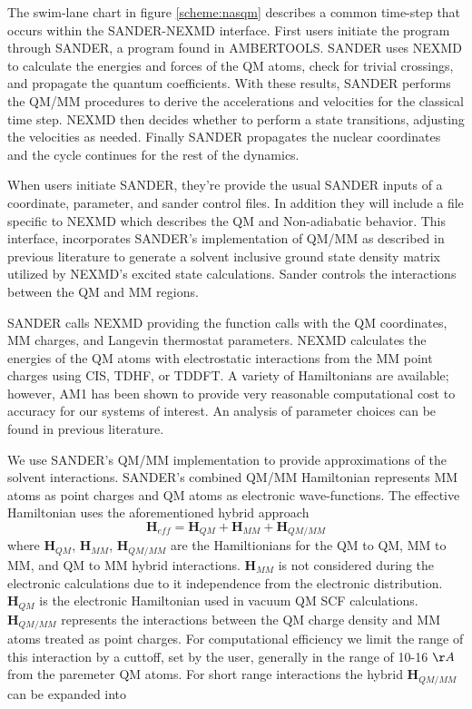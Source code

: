 The swim-lane chart in figure \ref{scheme:nasqm} describes a common time-step that occurs within the SANDER-NEXMD interface.
First users initiate the program through SANDER, a program found in AMBERTOOLS. SANDER uses NEXMD to calculate the energies and forces of the QM atoms, check for trivial crossings, and propagate the quantum coefficients.
With these results, SANDER performs the QM/MM procedures to derive the accelerations and velocities for the classical time step.
NEXMD then decides whether to perform a state transitions, adjusting the velocities as needed.
Finally SANDER propagates the nuclear coordinates and the cycle continues for the rest of the dynamics.

When users initiate SANDER, they're provide the usual SANDER inputs of a
coordinate, parameter, and sander control files.
In addition they will include a file specific to
NEXMD which describes the QM and Non-adiabatic behavior.
This interface, incorporates SANDER's implementation of QM/MM as described in previous literature to generate a solvent inclusive ground state density matrix utilized by NEXMD's excited state calculations.
Sander controls the interactions between the QM and MM regions.


SANDER calls NEXMD providing the function calls with the QM coordinates, MM charges, and Langevin thermostat parameters.\cite{paterlini1998constant}
NEXMD calculates the energies of the QM atoms with electrostatic interactions from the MM point charges using CIS, TDHF, or TDDFT.
A variety of Hamiltonians are available; however, AM1 has been shown to provide very reasonable computational cost to accuracy for our systems of interest.\cite{silva2010benchmark}
An analysis of parameter choices can be found in previous literature.\cite{nelson2012nonadiabatic}

We use SANDER's QM/MM implementation to provide approximations of the solvent interactions.\cite{Walker2008}
   SANDER's combined QM/MM Hamiltonian represents MM atoms as point charges and QM atoms as electronic wave-functions.
   The effective Hamiltonian uses the aforementioned hybrid approach
   \begin{equation}
     \mathbf{H}_{eff} = \mathbf{H}_{QM} + \mathbf{H}_{MM} + \mathbf{H}_{QM/MM}
   \end{equation}
   where \(\mathbf{H}_{QM}\), \(\mathbf{H}_{MM}\), \(\mathbf{H}_{QM/MM}\) are the Hamiltionians for the QM to QM, MM to MM, and QM to MM hybrid interactions.
   \(\mathbf{H}_{MM}\) is not considered during the electronic calculations due to it independence from the electronic distribution.
   \(\mathbf{H}_{QM}\) is the electronic Hamiltonian used in vacuum QM SCF calculations.
   \(\mathbf{H}_{QM/MM}\) represents the interactions between the QM charge density and MM atoms treated as point charges.
   For computational efficiency we limit the range of this interaction by a cuttoff, set by the user, generally in the range of 10-16 \(\AA\) from the paremeter QM atoms.
   For short range interactions the hybrid \(\mathbf{H}_{QM/MM}\) can be expanded into

